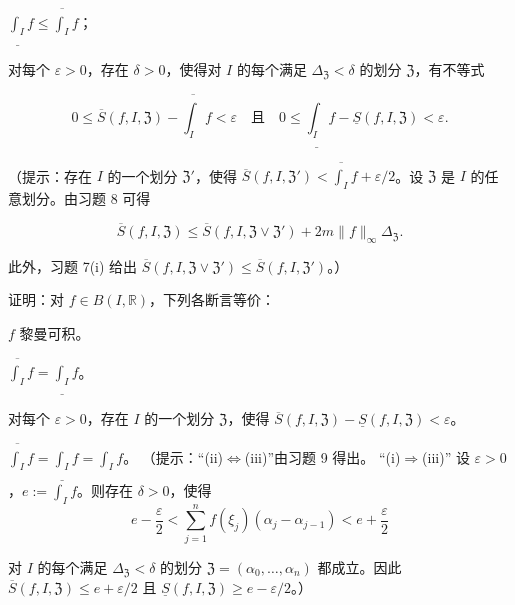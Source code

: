 \begin{exercises}
\begin{subitems}
$ \underline{\int_{I}} f \le \overline{\int_{I}} f $；

\item

对每个 $ \varepsilon > 0 $，存在 $ \delta > 0 $，使得对 $ I $ 的每个满足 $ \Delta_{\mathfrak{Z}} < \delta $ 的划分 $ \mathfrak{Z} $，有不等式

\[
0 \le \overline{S}(f, I, \mathfrak{Z}) - \overline{\int_{I}} f < \varepsilon \quad \text{且} \quad 0 \le \underline{\int_{I}} f - \underline{S}(f, I, \mathfrak{Z}) < \varepsilon .
\]

（提示：存在 $ I $ 的一个划分 $ \mathfrak{Z}' $，使得 $ \overline{S}(f, I, \mathfrak{Z}') < \overline{\int_{I}} f + \varepsilon/2 $。设 $ \mathfrak{Z} $ 是 $ I $ 的任意划分。由习题 8 可得

\[
\overline{S}(f, I, \mathfrak{Z}) \le \overline{S}(f, I, \mathfrak{Z} \vee \mathfrak{Z}') + 2m\|f\|_{\infty}\Delta_{\mathfrak{Z}} .
\]

此外，习题 7(i) 给出 $ \overline{S}(f, I, \mathfrak{Z} \vee \mathfrak{Z}') \le \overline{S}(f, I, \mathfrak{Z}') $。）

\end{subitems}

\item

证明：对 $ f \in B(I, \mathbb{R}) $，下列各断言等价：

\begin{subitems}
\item

$ f $ 黎曼可积。

\item

$ \overline{\int_{I}} f = \underline{\int_{I}} f $。

\item

对每个 $ \varepsilon > 0 $，存在 $ I $ 的一个划分 $ \mathfrak{Z} $，使得 $ \overline{S}(f, I, \mathfrak{Z}) - \underline{S}(f, I, \mathfrak{Z}) < \varepsilon $。

\proofhead
$ \overline{\int_{I}} f = \underline{\int_{I}} f = \int_{I} f $。
（提示：“(ii)$\Leftrightarrow$(iii)”由习题 9 得出。
“(i)$\Rightarrow$(iii)” 设 $ \varepsilon > 0 $，$ e := \int_{I} f $。则存在 $ \delta > 0 $，使得
\[
e - \frac{\varepsilon}{2} < \sum_{j=1}^{n} f(\xi_j)(\alpha_j - \alpha_{j-1}) < e + \frac{\varepsilon}{2}
\]

对 $ I $ 的每个满足 $ \Delta_{\mathfrak{Z}} < \delta $ 的划分 $ \mathfrak{Z} = (\alpha_0, \ldots, \alpha_n) $ 都成立。因此 $ \overline{S}(f, I, \mathfrak{Z}) \le e + \varepsilon/2 $ 且 $ \underline{S}(f, I, \mathfrak{Z}) \ge e - \varepsilon/2 $。）

\end{subitems}

\end{exercises}

